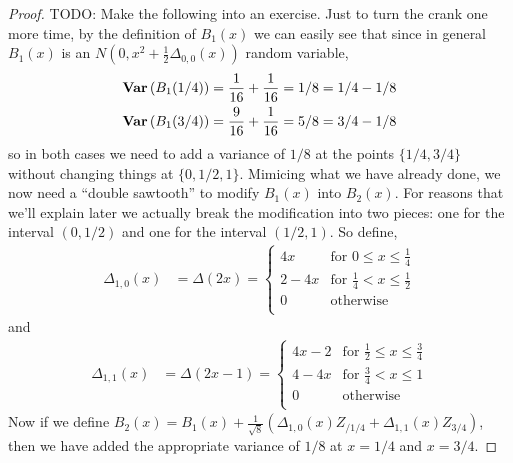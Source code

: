 \begin{proof}
TODO: Make the following into an exercise.
Just to turn the crank one more time, by the definition of $B_1(x)$ we
can easily see that since in general $B_1(x)$ is an $N(0, x^2 +
\frac{1}{2}\Delta_{0,0}(x))$ random variable,
\begin{align*}
\textbf{Var} \left (B_1(1/4) \right ) &= \frac{1}{16} + \frac{1}{16} = 1/8 = 1/4 - 1/8 \\
\textbf{Var} \left (B_1(3/4) \right ) &= \frac{9}{16} + \frac{1}{16} = 5/8 = 3/4 - 1/8 \\
\end{align*}
so in both cases we need to add a variance of $1/8$ at the points
$\lbrace 1/4, 3/4 \rbrace$ without changing things at $\lbrace 0, 1/2,
1\rbrace$.  Mimicing what we have already done, we now need a ``double
sawtooth'' to modify $B_1(x)$ into $B_2(x)$.  For reasons that we'll
explain later we actually break the modification into two pieces: one
for the interval $(0, 1/2)$ and one for the interval $(1/2, 1)$.  So
define,
\begin{align*}
\Delta_{1,0} (x) &= \Delta(2x) = \begin{cases}
4x & \text{for $0 \leq x \leq \frac{1}{4}$} \\
2 - 4x & \text{for $\frac{1}{4} < x \leq \frac{1}{2}$} \\
0 & \text{otherwise} \\
\end{cases}
\end{align*}
and
\begin{align*}
\Delta_{1,1} (x) &= \Delta(2x - 1) = \begin{cases}
4x -2 & \text{for $\frac{1}{2} \leq x \leq \frac{3}{4}$} \\
4 - 4x & \text{for $\frac{3}{4} < x \leq 1$} \\
0 & \text{otherwise} \\
\end{cases}
\end{align*}
Now if we define $B_2(x) = B_1(x) + \frac{1}{\sqrt{8}}
(\Delta_{1,0}(x) Z_{/1/4} + \Delta_{1,1}(x) Z_{3/4})$, then we have
  added the appropriate variance of $1/8$ at $x=1/4$ and $x=3/4$.


\end{proof}
